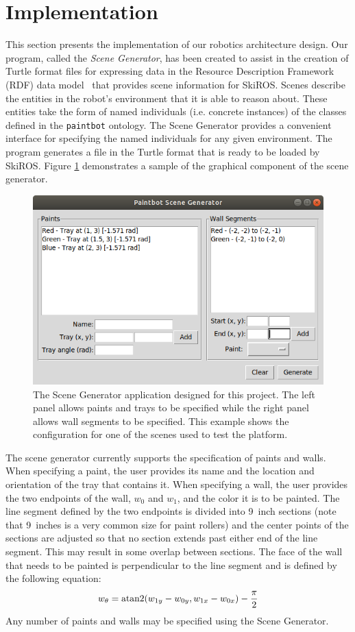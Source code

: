 \section{Implementation} \label{sec:implementation}
This section presents the implementation of our robotics architecture design. Our program, called the {\it Scene Generator}, has been created to assist in the creation of Turtle format files for expressing data in the Resource Description Framework (RDF) data model~\cite{beckett2014rdf} that provides scene information for SkiROS. Scenes describe the entities in the robot's environment that it is able to reason about. These entities take the form of named individuals (i.e. concrete instances) of the classes defined in the {\tt paintbot} ontology. The Scene Generator provides a convenient interface for specifying the named individuals for any given environment. The program generates a file in the Turtle format that is ready to be loaded by SkiROS. Figure \ref{fig:scene_generator} demonstrates a sample of the graphical component of the scene generator.

\begin{figure}
    \centering
    \includegraphics[width=0.7\linewidth]{images/scene_generator.png}
    \caption{The Scene Generator application designed for this project. The left panel allows paints and trays to be specified while the right panel allows wall segments to be specified. This example shows the configuration for one of the scenes used to test the platform.}
    \label{fig:scene_generator}
\end{figure}

The scene generator currently supports the specification of paints and walls. When specifying a paint, the user provides its name and the location and orientation of the tray that contains it. When specifying a wall, the user provides the two endpoints of the wall, $w_0$ and $w_1$, and the color it is to be painted. The line segment defined by the two endpoints is divided into \SI{9}{inch} sections (note that \SI{9}{inches} is a very common size for paint rollers) and the center points of the sections are adjusted so that no section extends past either end of the line segment. This may result in some overlap between sections. The face of the wall that needs to be painted is perpendicular to the line segment and is defined by the following equation:
\[w_\theta = \operatorname{atan2}(w_{1y} - w_{0y}, w_{1x} - w_{0x}) - \frac{\pi}{2}\]
Any number of paints and walls may be specified using the Scene Generator.

